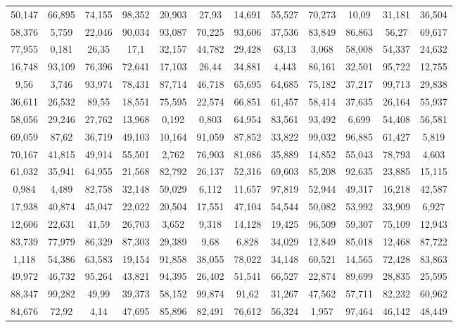 \documentclass[border=0.5cm]{standalone}
\begin{document}
\begin{tabular}{SSSSSSSSSSSS}
50,147	&	66,895	&	74,155	&	98,352	&	20,903	&	27,93	&	14,691	&	55,527	&	70,273	&	10,09	&	31,181	&	36,504	\\
58,376	&	5,759	&	22,046	&	90,034	&	93,087	&	70,225	&	93,606	&	37,536	&	83,849	&	86,863	&	56,27	&	69,617	\\
77,955	&	0,181	&	26,35	&	17,1	&	32,157	&	44,782	&	29,428	&	63,13	&	3,068	&	58,008	&	54,337	&	24,632	\\
16,748	&	93,109	&	76,396	&	72,641	&	17,103	&	26,44	&	34,881	&	4,443	&	86,161	&	32,501	&	95,722	&	12,755	\\
9,56	&	3,746	&	93,974	&	78,431	&	87,714	&	46,718	&	65,695	&	64,685	&	75,182	&	37,217	&	99,713	&	29,838	\\
36,611	&	26,532	&	89,55	&	18,551	&	75,595	&	22,574	&	66,851	&	61,457	&	58,414	&	37,635	&	26,164	&	55,937	\\
58,056	&	29,246	&	27,762	&	13,968	&	0,192	&	0,803	&	64,954	&	83,561	&	93,492	&	6,699	&	54,408	&	56,581	\\
69,059	&	87,62	&	36,719	&	49,103	&	10,164	&	91,059	&	87,852	&	33,822	&	99,032	&	96,885	&	61,427	&	5,819	\\
70,167	&	41,815	&	49,914	&	55,501	&	2,762	&	76,903	&	81,086	&	35,889	&	14,852	&	55,043	&	78,793	&	4,603	\\
61,032	&	35,941	&	64,955	&	21,568	&	82,792	&	26,137	&	52,316	&	69,603	&	85,208	&	92,635	&	23,885	&	15,115	\\
0,984	&	4,489	&	82,758	&	32,148	&	59,029	&	6,112	&	11,657	&	97,819	&	52,944	&	49,317	&	16,218	&	42,587	\\
17,938	&	40,874	&	45,047	&	22,022	&	20,504	&	17,551	&	47,104	&	54,544	&	50,082	&	53,992	&	33,909	&	6,927	\\
12,606	&	22,631	&	41,59	&	26,703	&	3,652	&	9,318	&	14,128	&	19,425	&	96,509	&	59,307	&	75,109	&	12,943	\\
83,739	&	77,979	&	86,329	&	87,303	&	29,389	&	9,68	&	6,828	&	34,029	&	12,849	&	85,018	&	12,468	&	87,722	\\
1,118	&	54,386	&	63,583	&	19,154	&	91,858	&	38,055	&	78,022	&	34,148	&	60,521	&	14,565	&	72,428	&	83,863	\\
49,972	&	46,732	&	95,264	&	43,821	&	94,395	&	26,402	&	51,541	&	66,527	&	22,874	&	89,699	&	28,835	&	25,595	\\
88,347	&	99,282	&	49,99	&	39,373	&	58,152	&	99,874	&	91,62	&	31,267	&	47,562	&	57,711	&	82,232	&	60,962	\\
84,676	&	72,92	&	4,14	&	47,695	&	85,896	&	82,491	&	76,612	&	56,324	&	1,957	&	97,464	&	46,142	&	48,449	\\

\end{tabular}
\end{document}
